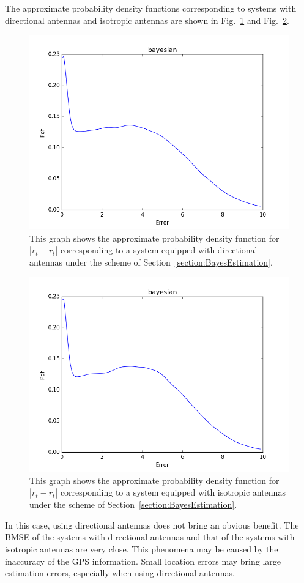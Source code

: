 The approximate probability density functions corresponding to systems with directional antennas and isotropic antennas are shown in Fig.~\ref{figure: bayesdirex} and Fig.~\ref{figure: bayesomniex}.
\begin{figure}[]
	\centering
	\includegraphics[scale=0.5]{Figures/bayesdirex.png}
	\caption{This graph shows the approximate probability density function for $|r_{t}-\hat{r_{t}}|$ corresponding to a system equipped with directional antennas under the scheme of Section~\ref{section:BayesEstimation}. }
	\label{figure: bayesdirex}
\end{figure}
\begin{figure}[]
	\centering
	\includegraphics[scale=0.5]{Figures/bayesomniex.png}
	\caption{This graph shows the approximate probability density function for $|r_{t}-\hat{r_{t}}|$ corresponding to a system equipped with isotropic antennas under the scheme of Section~\ref{section:BayesEstimation}. }
	\label{figure: bayesomniex}
\end{figure}
In this case, using directional antennas does not bring an obvious benefit.
The BMSE of the systems with directional antennas and that of the systems with isotropic antennas are very close.
This phenomena may be caused by the inaccuracy of the GPS information.
Small location errors may bring large estimation errors, especially when using directional antennas.



